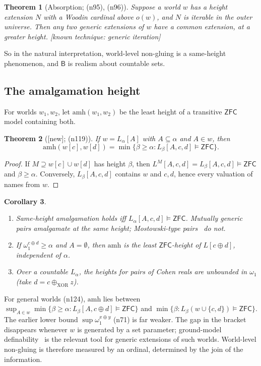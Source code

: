 \documentclass[11pt]{article}
\newtheorem{theorem}{Theorem}[section]
\newtheorem{corollary}[theorem]{Corollary}
\theoremstyle{definition}
\theoremstyle{remark}
\newcommand{\B}{\mathsf{B}}
\newcommand{\ZFC}{\mathsf{ZFC}}
\newcommand{\amh}{\mathrm{amh}}
\newcommand{\status}[1]{\textsf{[#1]}}
\newcommand{\note}[1]{\textsf{(n#1)}}
\begin{document}
\begin{theorem}[Absorption; \note{95}, \note{96}]
Suppose a world $w$ has a height extension $N$ with a Woodin cardinal above $o(w)$, and $N$ is iterable in the outer universe. Then any two generic extensions of $w$ have a common extension, at a greater height. \status{known technique: generic iteration}
\end{theorem}

\noindent So in the natural interpretation, world-level non-gluing is a same-height phenomenon, and $\B$ is realism about countable sets.

\subsection{The amalgamation height}\label{sec:amh}

For worlds $w_1,w_2$, let $\amh(w_1,w_2)$ be the least height of a transitive $\ZFC$ model containing both.

\begin{theorem}[\status{new}; \note{119}]\label{thm:amh}
If $w=L_\alpha[A]$ with $A\subseteq\alpha$ and $A\in w$, then
\[\amh(w[c],w[d])=\min\{\beta\ge\alpha:L_\beta[A,c,d]\models\ZFC\}.\]
\end{theorem}
\begin{proof}
If $M\supseteq w[c]\cup w[d]$ has height $\beta$, then $L^M[A,c,d]=L_\beta[A,c,d]\models\ZFC$ and $\beta\ge\alpha$. Conversely, $L_\beta[A,c,d]$ contains $w$ and $c,d$, hence every valuation of names from $w$.
\end{proof}

\begin{corollary}
\leavevmode
\begin{enumerate}
\item Same-height amalgamation holds iff $L_\alpha[A,c,d]\models\ZFC$. Mutually generic pairs amalgamate at the same height; Mostowski-type pairs~\cite{HHKVW} do not.
\item If $\omega_1^{c\oplus d}\ge\alpha$ and $A=\emptyset$, then $\amh$ is the least $\ZFC$-height of $L[c\oplus d]$, independent of $\alpha$.
\item Over a countable $L_\alpha$, the heights for pairs of Cohen reals are unbounded in $\omega_1$ (take $d=c\oplus_{\mathrm{XOR}}z$).
\end{enumerate}
\end{corollary}

\noindent For general worlds \note{124}, $\amh$ lies between $\sup_{A\in w}\min\{\beta\ge\alpha:L_\beta[A,c\oplus d]\models\ZFC\}$ and $\min\{\beta:L_\beta(w\cup\{c,d\})\models\ZFC\}$. The earlier lower bound $\sup\omega_1^{x\oplus y}$ \note{71} is far weaker. The gap in the bracket disappears whenever $w$ is generated by a set parameter; ground-model definability~\cite{Laver07,FHR15} is the relevant tool for generic extensions of such worlds. World-level non-gluing is therefore measured by an ordinal, determined by the join of the information.
\end{document}
